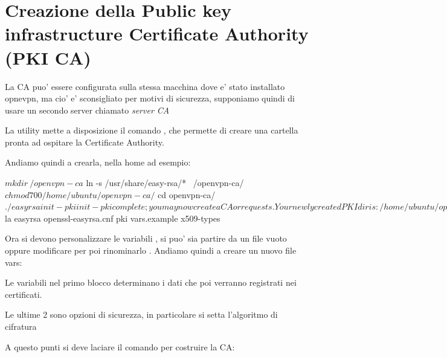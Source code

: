 \section{Creazione della Public key infrastructure Certificate Authority (PKI CA)}


La CA puo' essere configurata sulla stessa macchina dove e' stato installato opnevpn, ma cio' e' sconsigliato per motivi di sicurezza, supponiamo quindi di usare un secondo server chiamato \textit{server CA}

La utility  mette a disposizione il comando , che permette di creare una cartella pronta ad ospitare la Certificate Authority.

Andiamo quindi a crearla, nella home ad esempio:

\begin{bashcode}
$ mkdir ~/openvpn-ca
$ ln -s /usr/share/easy-rsa/* ~/openvpn-ca/
$ chmod 700 /home/ubuntu/openvpn-ca/
$ cd openvpn-ca/
$ ./easyrsa init-pki

init-pki complete; you may now create a CA or requests.
Your newly created PKI dir is: /home/ubuntu/openvpn-ca/pki

$ la
easyrsa  openssl-easyrsa.cnf  pki  vars.example  x509-types
\end{bashcode}

Ora si devono personalizzare le variabili , si puo' sia partire da un file vuoto oppure modificare  per poi rinominarlo .
Andiamo quindi a creare un nuovo file vars:


Le variabili nel primo blocco determinano i dati che poi verranno registrati nei certificati.

Le ultime 2 sono opzioni di sicurezza, in particolare si setta l'algoritmo di cifratura %

A questo punti si deve laciare il comando  per costruire la CA:

